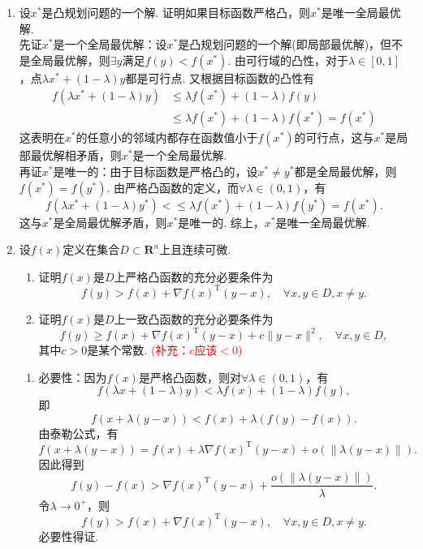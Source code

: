 \begin{enumerate}
    \item 设$x^*$是凸规划问题的一个解. 证明如果目标函数严格凸，则$x^*$是唯一全局最优解.\\
    \pro 先证$x^*$是一个全局最优解：设$x^*$是凸规划问题的一个解(即局部最优解)，但不是全局最优解，则$\exists y$满足$f(y)<f(x^*)$. 由可行域的凸性，对于$\lambda \in [0,1]$，点$\lambda x^*+(1-\lambda)y$都是可行点. 又根据目标函数的凸性有
    \begin{align*}
        f(\lambda x^*+(1-\lambda)y) & \leqslant \lambda f(x^*) + (1-\lambda)f(y)\\
        & \leqslant \lambda f(x^*) + (1-\lambda)f(x^*) = f(x^*)
    \end{align*}
    这表明在$x^*$的任意小的邻域内都存在函数值小于$f(x^*)$的可行点，这与$x^*$是局部最优解相矛盾，则$x^*$是一个全局最优解.\\
    再证$x^*$是唯一的：由于目标函数是严格凸的，设$x^* \neq y^*$都是全局最优解，则$f(x^*)=f(y^*)$. 由严格凸函数的定义，而$\forall \lambda \in (0,1)$，有
    \[f(\lambda x^*+(1-\lambda)y^*) < \leqslant \lambda f(x^*) + (1-\lambda)f(y^*) = f(x^*).\]
    这与$x^*$是全局最优解矛盾，则$x^*$是唯一的. 综上，$x^*$是唯一全局最优解.
    \item 设$f(x)$定义在集合$D \subset \textbf{R}^n$上且连续可微.
    \begin{enumerate}[label=(\arabic*)]
        \item 证明$f(x)$是$D$上严格凸函数的充分必要条件为\[f(y)>f(x)+ \nabla f(x)^{\mathrm{T}} (y-x),\quad\forall x,y \in D,x \neq y.\]
        \item 证明$f(x)$是$D$上一致凸函数的充分必要条件为\[f(y) \geqslant f(x)+ \nabla f(x)^{\mathrm{T}} (y-x) + c\|y-x\|^2,\quad\forall x,y \in D,\]其中$c>0$是某个常数. \textcolor{red}{(补充：$c$应该$<0$)}
    \end{enumerate}
    \pro \begin{enumerate}[label=(\arabic*)]
        \item 必要性：因为$f(x)$是严格凸函数，则对$\forall \lambda \in (0,1)$，有
        \[f(\lambda x+(1-\lambda)y) < \lambda f(x) + (1-\lambda) f(y),\]
        即
        \[f(x + \lambda(y-x)) < f(x) + \lambda(f(y)-f(x)).\]
        由泰勒公式，有\[f(x + \lambda(y-x)) = f(x) + \lambda \nabla f(x)^{\mathrm{T}} (y-x)+o(\|\lambda(y-x)\|).\]
        因此得到\[f(y)-f(x) > \nabla f(x)^{\mathrm{T}} (y-x)+\frac{o(\|\lambda(y-x)\|)}{\lambda}.\]
        令$\lambda \to 0^+$，则
        \[f(y)>f(x)+ \nabla f(x)^{\mathrm{T}} (y-x),\quad\forall x,y \in D,x \neq y.\]
        必要性得证.\\

\end{enumerate}
\end{enumerate}
